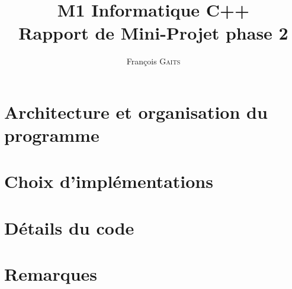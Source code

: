 \documentclass[]{article}
\author{François G\textsc{aits}}
\title{M1 Informatique C++\\Rapport de Mini-Projet phase 2}
\begin{document}
\maketitle

\section{Architecture et organisation du programme}


\section{Choix d'implémentations}


\section{Détails du code}


\section{Remarques}
\end{document}
